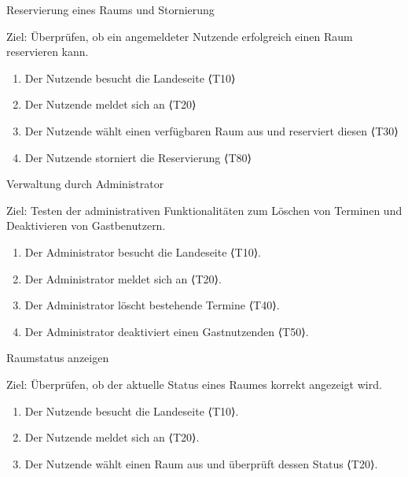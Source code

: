 \pagebreak

\begin{scenario}{20}{Reservierung eines Raums und Stornierung}
  \item[Ziel:] Überprüfen, ob ein angemeldeter Nutzende erfolgreich einen Raum reservieren kann.
  \begin{enumerate}
    \item Der Nutzende besucht die Landeseite ⟨T10⟩
    \item Der Nutzende meldet sich an ⟨T20⟩
    \item Der Nutzende wählt einen verfügbaren Raum aus und reserviert diesen ⟨T30⟩
    \item Der Nutzende storniert die Reservierung ⟨T80⟩
  \end{enumerate}
\end{scenario}

\begin{scenario}{30}{Verwaltung durch Administrator}
  \item[Ziel:] Testen der administrativen Funktionalitäten zum Löschen von Terminen und Deaktivieren von Gastbenutzern.
  \begin{enumerate}
    \item Der Administrator besucht die Landeseite ⟨T10⟩.
    \item Der Administrator meldet sich an ⟨T20⟩.
    \item Der Administrator löscht bestehende Termine ⟨T40⟩.
    \item Der Administrator deaktiviert einen Gastnutzenden ⟨T50⟩.
  \end{enumerate}
\end{scenario}

\begin{scenario}{40}{Raumstatus anzeigen}
  \item[Ziel:] Überprüfen, ob der aktuelle Status eines Raumes korrekt angezeigt wird.
  \begin{enumerate}
    \item Der Nutzende besucht die Landeseite ⟨T10⟩.
    \item Der Nutzende meldet sich an ⟨T20⟩.
    \item Der Nutzende wählt einen Raum aus und überprüft dessen Status ⟨T20⟩.
  \end{enumerate}
\end{scenario}







